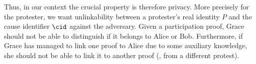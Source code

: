Thus, in our context the crucial property is therefore privacy.
More precisely for the protester, we want unlinkability between a protester's real identity \(P\) and the cause identifier \(\cid\) against the adversary.
Given a participation proof, Grace should not be able to distinguish if it belongs to Alice or Bob.
Furthermore, if Grace has managed to link one proof to Alice due to some auxiliary knowledge, she should not be able to link it to another proof (\eg, from a different protest).



